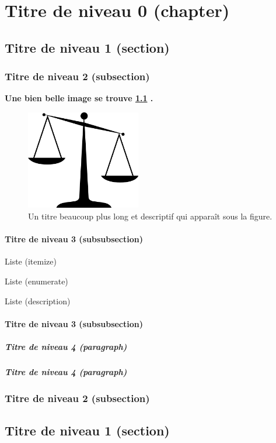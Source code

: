 \chapter{Titre de niveau 0 (chapter)}
\thispagestyle{plainNormal}


\blindtext


\section{Titre de niveau 1 (section)}
\blindtext

	\subsection{Titre de niveau 2 (subsection)}
\blindtext

\textbf{Une bien belle image se trouve \cref{fig53} .}

\begin{figure}
\begin{center}
	\includegraphics[width=5cm]{figures/part2/figure_53.png}
	\caption[Titre court table des matières]{Un titre beaucoup plus long et descriptif qui apparaît sous la figure.}
	\label{fig53}
\end{center}
\end{figure}

		\subsubsection{Titre de niveau 3 (subsubsection)}
\blindtext

\medskip
Liste (itemize)
\blinditemize

\medskip
Liste (enumerate)
\blindenumerate

\medskip
Liste (description)
\blinddescription

		\subsubsection{Titre de niveau 3 (subsubsection)}
\paragraph{Titre de niveau 4 (paragraph)} \blindtext

\paragraph{Titre de niveau 4 (paragraph)} \blindtext

	\subsection{Titre de niveau 2 (subsection)}
\blindtext


\section{Titre de niveau 1 (section)}
\blindtext


\clearpage
\thispagestyle{empty}